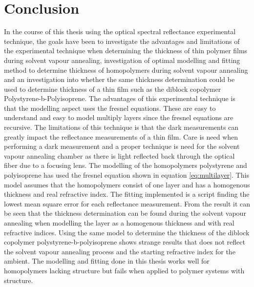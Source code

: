 \documentclass[MasterThesisMain.tex]{subfiles}
\begin{document}
\chapter{Conclusion} \label{ch:conclusion}
In the course of this thesis using the optical spectral reflectance experimental technique, the goals have been to investigate the advantages and limitations of the experimental technique when determining the thickness of thin polymer films during solvent vapour annealing, investigation of optimal modelling and fitting method to determine thickness of homopolymers during solvent vapour annealing and an investigation into whether the same thickness determination could be used to determine thickness of a thin film such as the diblock copolymer Polystyrene-b-Polyisoprene. The advantages of this experimental technique is that the modelling aspect uses the fresnel equations. These are easy to understand and easy to model multiply layers since the fresnel equations are recursive. The limitations of this technique is that the dark measurements can greatly impact the reflectance measurements of a thin film. Care is need when performing a dark measurement and a proper technique is need for the solvent vapour annealing chamber as there is light reflected back through the optical fiber due to a focusing lens. The modelling of the homopolymers polystyrene and polyisoprene has used the fresnel equation shown in equation \ref{eq:multilayer}. This model assumes that the homopolymers consist of one layer and has a homogenous thickness and real refractive index. The fitting implemented is a script finding the lowest mean square error for each reflectance measurement. From the result it can be seen that the thickness determination can be found during the solvent vapour annealing when modelling the layer as a homogenous thickness and with real refractive indices. Using the same model to determine the thickness of the diblock copolymer polystyrene-b-polyisoprene shows strange results that does not reflect the solvent vapour annealing process and the starting refractive index for the ambient. The modelling and fitting done in this thesis works well for homopolymers lacking structure but fails when applied to polymer systems with structure.     
\end{document}
